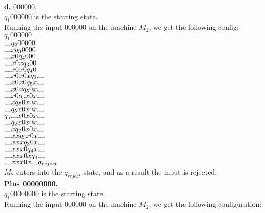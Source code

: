 \documentclass[12pt]{article}
\newcommand\Vtextvisiblespace[1][.8em]{%
	\mbox{\kern.07em\vrule height.3ex}%
	\vbox{\hrule width#1}%
	\hbox{\vrule height.3ex}}
\begin{document}
\textbf{d.} 000000. \\
$q_1 000000$ is the starting state. \\
Running the input 000000 on the machine $M_2$, we get the following config: \\

$q_1 000000$ \\
$\Vtextvisiblespace       q_2 00000 $  \\
$\Vtextvisiblespace x     q_3 0000 $ \\
$\Vtextvisiblespace x0    q_4 000 $ \\
$\Vtextvisiblespace x0x   q_3 00 $ \\
$\Vtextvisiblespace x0x0  q_4 0 $ \\
$\Vtextvisiblespace x0x0x q_3 \Vtextvisiblespace $ \\
$\Vtextvisiblespace x0x0  q_5 x \Vtextvisiblespace $ \\
$\Vtextvisiblespace x0x   q_5 0x \Vtextvisiblespace $ \\
$\Vtextvisiblespace x0    q_5 x0x \Vtextvisiblespace $ \\
$\Vtextvisiblespace x     q_5 0x0x \Vtextvisiblespace $ \\
$\Vtextvisiblespace       q_5 x0x0x \Vtextvisiblespace $ \\
$q_5 \Vtextvisiblespace x0x0x \Vtextvisiblespace $ \\
$\Vtextvisiblespace       q_2 x0x0x \Vtextvisiblespace $ \\
$\Vtextvisiblespace x     q_2 0x0x \Vtextvisiblespace $ \\
$\Vtextvisiblespace xx    q_3 x0x \Vtextvisiblespace $ \\
$\Vtextvisiblespace xxx   q_3 0x \Vtextvisiblespace $ \\
$\Vtextvisiblespace xxx0  q_4 x \Vtextvisiblespace $ \\
$\Vtextvisiblespace xxx0x q_4  \Vtextvisiblespace $ \\
$\Vtextvisiblespace xxx0x \Vtextvisiblespace q_{reject} $ \\
$M_2$ enters into the $q_{reject}$ state, and as a result the input is rejected. \\

\pagebreak
\textbf{Plus 00000000.} \\

$q_1 00000000$ is the starting state. \\
Running the input 000000 on the machine $M_2$, we get the following configuration: \\
\end{document}
